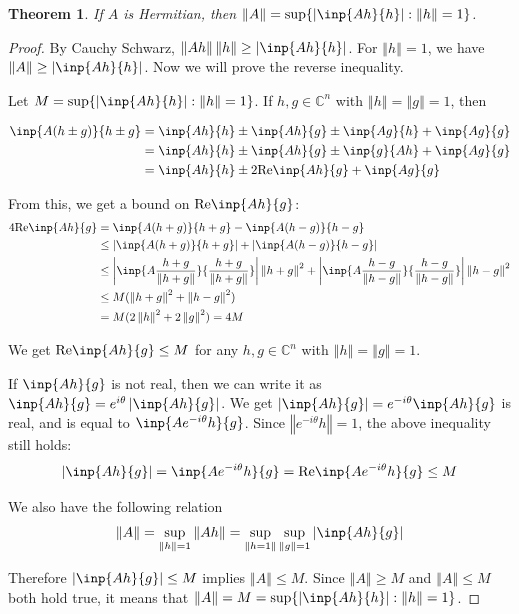 \documentclass[twofold]{article}
\newcommand*\norm[1]{\left \Vert #1 \right\Vert}
\newcommand*\abs[1]{\left \vert #1 \right\vert}
\theoremstyle{plain}
\newtheorem{theorem}{Theorem}
\theoremstyle{definition}
\theoremstyle{remark}
\begin{document}
\begin{theorem}\label{norm_herm} If \(A\) is Hermitian, then \(\norm{A} = \sup\{\abs{\inp{Ah}{h}} : \norm{h} = 1\}\).\end{theorem}
\begin{proof} By Cauchy Schwarz, \(\norm{Ah}\norm{h} \ge \abs{\inp{Ah}{h}}\). For \(\norm{h} =1\), we have  \(\norm{A} \ge \abs{\inp{Ah}{h}}\). Now we will prove the reverse inequality. 

Let \(M = \sup \{\abs{\inp{Ah}{h}} : \norm{h} = 1 \}\). If \(h, g \in \mathbb{C}^n\) with \(\norm{h} = \norm{g} = 1\), then

\begin{equation*} \begin{split}
\inp{A (h \pm g)}{h\pm g} & = \inp{Ah}{h} \pm \inp{Ah}{g} \pm \inp{Ag}{h} + \inp{Ag}{g} \\
& = \inp{Ah}{h} \pm \inp{Ah}{g} \pm \inp{g}{Ah} + \inp{Ag}{g} \\
& = \inp{Ah}{h} \pm 2 \text{Re}\inp{Ah}{g} + \inp{Ag}{g} \\
\end{split} \end{equation*}

From this, we get a bound on \(\mathrm{Re}\inp{Ah}{g}\):
\begin{equation*} \begin{split}
4\mathrm{Re} \inp{Ah}{g} &= \inp{A(h+g)}{h+g} - \inp{A(h-g)}{h-g} \\
& \le \abs{\inp{A(h+g)}{h+g}} + \abs{\inp{A(h-g)}{h-g}} \\
& \le \abs{\inp{A \frac{h+g}{\norm{h+g}}}{\frac{h+g}{\norm{h+g}}}} \norm{h + g}^2 + \abs{\inp{A \frac{h-g}{\norm{h-g}}}{\frac{h-g}{\norm{h-g}}}} \norm{h - g}^2\\
& \le M (\norm{h + g}^2 + \norm{h-g}^2) \\
& = M (2 \norm{h}^2 + 2 \norm{g}^2) = 4M 
\end{split} \end{equation*}


We get \(\text{Re} \inp{Ah}{g} \le M\) for any \(h, g \in \mathbb{C}^n\) with \(\norm{h} = \norm{g} = 1\). 

If \(\inp{Ah}{g}\) is not real, then we can write it as  \(\inp{Ah}{g} = e^{i \theta} \abs{\inp{Ah}{g}}\). We get \(\abs{\inp{Ah}{g}} = e^{-i \theta} \inp{Ah}{g}\) is real, and is equal to \(\inp{A e^{- i\theta}h}{g}\). Since \(\norm{e^{-i\theta} h}= 1\), the above inequality still holds:
 \[\abs{\inp{Ah}{g}} = \inp{Ae^{-i\theta}h}{g} =  \text{Re} \inp{Ae^{-i\theta}h}{g} \le M\]

We also have the following relation
 \[\norm{A} = \sup_{\norm{h} =1} \norm{Ah} = \sup_{\norm{h = 1}} \sup_{\norm{g} = 1} \abs{\inp{Ah}{g}} \]

Therefore \(\abs{\inp{Ah}{g}} \le M\)  implies \(\norm{A} \le M\). Since \(\norm{A} \ge M\) and \(\norm{A} \le M\) both hold true, it means that \(\norm{A} = M = \sup \{ \abs{\inp{Ah}{h}} : \norm{h} = 1 \}\).
\end{proof}
\end{document}
